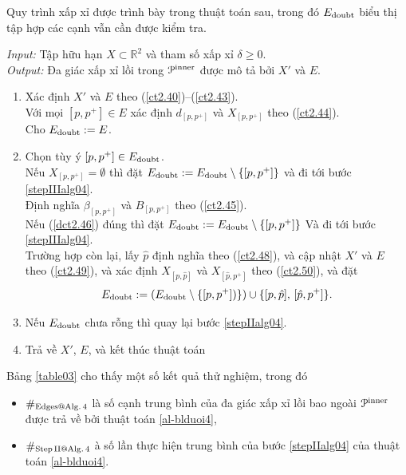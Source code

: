 \documentclass[12pt,a4paper,openany,oneside]{report}
\def\R{\mathbb{R}}
\begin{document}
Quy trình xấp xỉ được trình bày trong thuật toán sau, trong đó  $E_{\rm doubt}$ biểu thị tập hợp các cạnh vẫn cần được kiểm tra.

\begin{algorithm}\label{alg04}  \rm 
	\caption{}  \label{al-blduoi4}
	\emph{Input:} Tập hữu hạn $X \subset \R^2$ và tham số xấp xỉ $\delta \geq 0$. \\
	\emph{Output:} Đa giác xấp xỉ lồi trong ${\cal P}^{\rm inner}$ được mô tả bởi $X'$ và $E$.
	\begin{enumerate}
		\item\label{stepIalg04} 
		Xác định $X'$ và $E$ theo (\ref{ct2.40})--(\ref{ct2.43}).\\
		Với mọi $[p, p^+] \in E$ xác định $d_{[p, p^+]}$ và $X_{[p, p^+]}$ theo (\ref{ct2.44}).\\
		Cho $E_{\rm doubt} := E$.
		
		\item\label{stepIIalg04} 
		 Chọn tùy ý $[p, p^+] \in E_{\rm doubt}$. \\
		Nếu $X_{[p, p^+]} = \emptyset$ thì đặt
		$E_{\rm doubt} := E_{\rm doubt} \setminus \{[p, p^+]\}$
		và đi tới bước \ref{stepIIIalg04}.\\
		Định nghĩa $\beta_{[p, p^+]}$ và $B_{[p, p^+]}$ theo (\ref{ct2.45}). \\
		Nếu (\ref{dct2.46}) đúng thì đặt
		$E_{\rm doubt} := E_{\rm doubt} \setminus \{[p, p^+]\}$
		Và đi tới bước \ref{stepIIIalg04}.\\
		Trường hợp còn lại, lấy $\hat p$ định nghĩa theo (\ref{ct2.48}),
		và cập nhật $X'$ và $E$ theo (\ref{ct2.49}), và xác định $X_{[p, \hat p]}$ và $X_{[\hat p, p^+]}$ theo (\ref{ct2.50}),	và đặt
		\begin{equation*}%
			E_{\rm doubt} := (E_{\rm doubt} \setminus \{[p, p^+])\}) \cup \{[p, \hat p], \, [\hat p, p^+]\}.
		\end{equation*}
		
		\item\label{stepIIIalg04} 
		Nếu $E_{\rm doubt}$ chưa rỗng thì quay lại bước \ref{stepIIalg04}.
		
		\item
		Trả về $X'$, $E$, và kết thúc thuật toán
	\end{enumerate}
\end{algorithm}


\medskip
Bảng \ref{table03}  cho thấy một số kết quả thử nghiệm, trong đó
\begin{itemize}
	\item $\#_{\rm Edges@ Alg.\, 4}$  là số cạnh trung bình của đa giác xấp xỉ lồi bao ngoài ${\cal P}^{\rm inner}$ được trả về bởi thuật toán \ref{al-blduoi4},
	\item $\#_{\rm Step\, II @ Alg.\, 4}$ à số lần thực hiện trung bình của bước \ref{stepIIalg04} của thuật toán \ref{al-blduoi4}.
\end{itemize}
\end{document}
